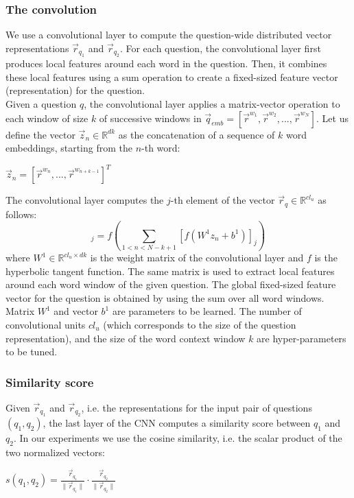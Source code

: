 \documentclass[10pt,twocolumn,letterpaper]{article}
\begin{document}
\subsubsection{The convolution}
We use a convolutional layer to compute the question-wide distributed vector representations $\vec{r}_{q_1}$ and $\vec{r}_{q_2}$. For each question, the convolutional layer first produces local features around each word in the question. Then, it combines these local features using a sum operation to create a fixed-sized feature vector (representation) for the question.\\
Given a question $q$, the convolutional layer applies a matrix-vector operation to each window of size $k$ of successive windows in $\vec{q}_{emb} = [\vec{r}^{w_1},\vec{r}^{w_2}, ..., \vec{r}^{w_N}]$. Let us define the vector $\vec{z}_n \in \mathbb{R}^{dk}$ as the concatenation of a sequence of $k$ word embeddings, starting from the $n$-th word:
\begin{center}
$\vec{z}_n = [\vec{r}^{w_n}, ... ,\vec{r}^{w_{n+k-1}}]^T$
\end{center}
The convolutional layer computes the $j$-th element of the vector $\vec{r}_{q} \in \mathbb{R}^{cl_u}$ as follows: 
\begin{equation}
[\vec{r}_{q}]_j = f \left( \sum_{1<n<N-k+1}[f(W^1 z_n + b^1)]_j \right)
\label{eq:conv}
\end{equation}
where $W^1 \in \mathbb{R}^{cl_u \times dk}$ is the weight matrix of the convolutional layer and $f$ is the hyperbolic tangent function. The same matrix is used to extract local features around each word window of the given question. The global fixed-sized feature vector for the question is obtained by using the sum over all word windows.\\
Matrix $W^1$ and vector $b^1$ are parameters to be learned. The number of convolutional units $cl_u$ (which corresponds to the size of the question representation), and the size of the word context window $k$ are hyper-parameters to be tuned. 

\subsubsection{Similarity score}
Given $\vec{r}_{q_1}$ and $\vec{r}_{q_2}$, i.e. the representations for the input pair of questions $(q_1, q_2)$, the last layer of the CNN computes a similarity score between $q_1$ and $q_2$. In our experiments we use the cosine similarity, i.e. the scalar product of the two normalized vectors:
\begin{center}
$s(q_1, q_2) = \frac{\vec{r}_{q_1}}{\lVert \vec{r}_{q_1} \rVert} \cdot \frac{\vec{r}_{q_2}}{\lVert \vec{r}_{q_2} \rVert}$
\end{center}
\end{document}
